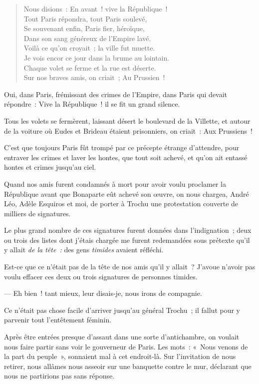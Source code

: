 \documentclass[french,twoside]{book} %
\begin{document}
\begin{verse}
Nous disions : En avant ! vive la République !\\
Tout Paris répondra, tout Paris soulevé,\\
Se souvenant enfin, Paris fier, héroïque,\\
Dans son sang généreux de l’Empire lavé.\\
Voilà ce qu’on croyait ; la ville fut muette.\\
Je vois encor ce jour dans la brume au lointain.\\
Chaque volet se ferme et la rue est déserte.\\
Sur nos braves amis, on criait ; Au Prussien !\\
\end{verse}

\noindent Oui, dans Paris, frémissant des crimes de l’Empire, dans Paris qui devait répondre : Vive la République ! il se fit un grand silence.\par
Tous les volets se fermèrent, laissant désert le boulevard de la Villette, et autour de la voiture où Eudes et Brideau étaient prisonniers, on criait : Aux Prussiens !\par
C’est que toujours Paris fût trompé par ce précepte étrange d’attendre, pour entraver les crimes et laver les hontes, que tout soit achevé, et qu’on ait entassé hontes et crimes jusqu’au ciel.\par
Quand nos amis furent condamnés à mort pour avoir voulu proclamer la République avant que Bonaparte eût achevé son œuvre, on nous chargea, André Léo, Adèle Esquiros et moi, de porter  à Trochu une protestation couverte de milliers de signatures.\par
Le plus grand nombre de ces signatures furent données dans l’indignation ; deux ou trois des listes dont j’étais chargée me furent redemandées sous prétexte qu’il y allait \emph{de la tête :} des gens \emph{timides} avaient réfléchi.\par
Est-ce que ce n’était pas de la tête de nos amis qu’il y allait ? J’avoue n’avoir pas voulu effacer ces deux ou trois signatures de personnes timides.\par
— Eh bien ! tant mieux, leur disais-je, nous irons de compagnie.\par
Ce n’était pas chose facile d’arriver jusqu’au général Trochu ; il fallut pour y parvenir tout l’entêtement féminin.\par
Après être entrées presque d’assaut dans une sorte d’antichambre, on voulait nous faire partir sans voir le gouverneur de Paris. Les mots : « Nous venons de la part du peuple », sonnaient mal à cet endroit-là. Sur l’invitation de nous retirer, nous allâmes nous asseoir sur une banquette contre le mur, déclarant que nous ne partirions pas sans réponse.\par
\end{document}
